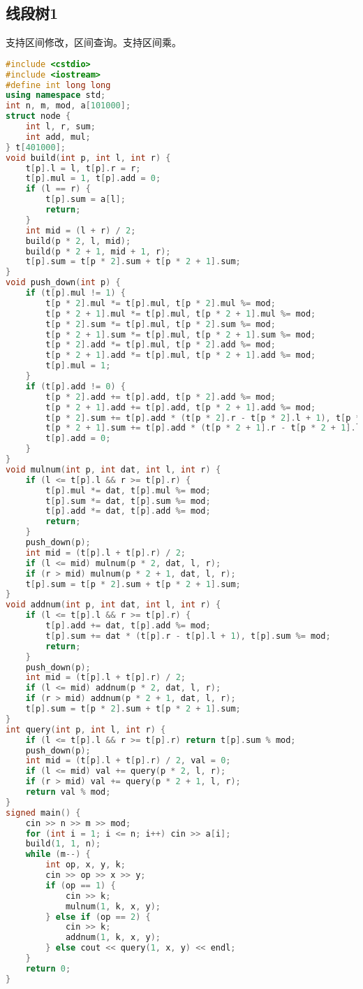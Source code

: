 \documentclass[9pt, a4paper, oneside]{book}
\begin{document}
\subsection{线段树1}
支持区间修改，区间查询。支持区间乘。
\begin{lstlisting}[language={C++}]
#include <cstdio>
#include <iostream>
#define int long long
using namespace std;
int n, m, mod, a[101000];
struct node {
    int l, r, sum;
    int add, mul;
} t[401000];
void build(int p, int l, int r) {
    t[p].l = l, t[p].r = r;
    t[p].mul = 1, t[p].add = 0;
    if (l == r) {
        t[p].sum = a[l];
        return;
    }
    int mid = (l + r) / 2;
    build(p * 2, l, mid);
    build(p * 2 + 1, mid + 1, r);
    t[p].sum = t[p * 2].sum + t[p * 2 + 1].sum;
}
void push_down(int p) {
    if (t[p].mul != 1) {
        t[p * 2].mul *= t[p].mul, t[p * 2].mul %= mod;
        t[p * 2 + 1].mul *= t[p].mul, t[p * 2 + 1].mul %= mod;
        t[p * 2].sum *= t[p].mul, t[p * 2].sum %= mod;
        t[p * 2 + 1].sum *= t[p].mul, t[p * 2 + 1].sum %= mod;
        t[p * 2].add *= t[p].mul, t[p * 2].add %= mod;
        t[p * 2 + 1].add *= t[p].mul, t[p * 2 + 1].add %= mod;
        t[p].mul = 1;
    }
    if (t[p].add != 0) {
        t[p * 2].add += t[p].add, t[p * 2].add %= mod;
        t[p * 2 + 1].add += t[p].add, t[p * 2 + 1].add %= mod;
        t[p * 2].sum += t[p].add * (t[p * 2].r - t[p * 2].l + 1), t[p * 2].sum %= mod;
        t[p * 2 + 1].sum += t[p].add * (t[p * 2 + 1].r - t[p * 2 + 1].l + 1), t[p * 2 + 1].sum %= mod;
        t[p].add = 0;
    }
}
void mulnum(int p, int dat, int l, int r) {
    if (l <= t[p].l && r >= t[p].r) {
        t[p].mul *= dat, t[p].mul %= mod;
        t[p].sum *= dat, t[p].sum %= mod;
        t[p].add *= dat, t[p].add %= mod;
        return;
    }
    push_down(p);
    int mid = (t[p].l + t[p].r) / 2;
    if (l <= mid) mulnum(p * 2, dat, l, r);
    if (r > mid) mulnum(p * 2 + 1, dat, l, r);
    t[p].sum = t[p * 2].sum + t[p * 2 + 1].sum;
}
void addnum(int p, int dat, int l, int r) {
    if (l <= t[p].l && r >= t[p].r) {
        t[p].add += dat, t[p].add %= mod;
        t[p].sum += dat * (t[p].r - t[p].l + 1), t[p].sum %= mod;
        return;
    }
    push_down(p);
    int mid = (t[p].l + t[p].r) / 2;
    if (l <= mid) addnum(p * 2, dat, l, r);
    if (r > mid) addnum(p * 2 + 1, dat, l, r);
    t[p].sum = t[p * 2].sum + t[p * 2 + 1].sum;
}
int query(int p, int l, int r) {
    if (l <= t[p].l && r >= t[p].r) return t[p].sum % mod;
    push_down(p);
    int mid = (t[p].l + t[p].r) / 2, val = 0;
    if (l <= mid) val += query(p * 2, l, r);
    if (r > mid) val += query(p * 2 + 1, l, r);
    return val % mod;
}
signed main() {
    cin >> n >> m >> mod;
    for (int i = 1; i <= n; i++) cin >> a[i];
    build(1, 1, n);
    while (m--) {
        int op, x, y, k;
        cin >> op >> x >> y;
        if (op == 1) {
            cin >> k;
            mulnum(1, k, x, y);
        } else if (op == 2) {
            cin >> k;
            addnum(1, k, x, y);
        } else cout << query(1, x, y) << endl;
    }
    return 0;
}\end{lstlisting}
\end{document}
